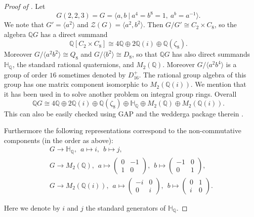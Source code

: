 \documentclass[a4paper,10pt]{amsart}
\theoremstyle{definition}
\theoremstyle{remark}
\newcommand{\ZZ}{\mathcal{Z}}
\begin{document}
\begin{proof}[Proof of ]
Let
\[G(2,2,3) = G = \langle a, b \ | \ a^4 = b^8 = 1, \ a^b = a^{-1} \rangle. \]
We note that $G' = \langle a^2 \rangle$ and $\ZZ(G) = \langle a^2, b^2 \rangle$. Then $G/G' \cong C_2 \times C_8$, so the algebra $\mathbb{Q}G$ has a direct summand 
\[\mathbb{Q}[C_2 \times C_8] \cong 4\mathbb{Q} \oplus 2\mathbb{Q}(i) \oplus \mathbb{Q}(\zeta_8).\]
Moreover $G/\langle a^2b^2 \rangle \cong Q_8$ and $G/\langle b^2 \rangle \cong D_8$, so that $\mathbb{Q}G$ has also direct summands $\mathbb{H}_\mathbb{Q}$, the standard rational quaternions, and $M_2(\mathbb{Q})$. Moreover $G/\langle a^2b^4 \rangle$ is a group of order $16$ sometimes denoted by $D_{16}^+$. The rational group algebra of this group has one matrix component isomorphic to $M_2(\mathbb{Q}(i))$. We mention that it has been used in \cite{BachleMaheshwaryMargolis} to solve another problem on integral group rings. Overall
\[ \mathbb{Q}G \cong 4\mathbb{Q} \oplus 2\mathbb{Q}(i) \oplus \mathbb{Q}(\zeta_8) \oplus \mathbb{H}_\mathbb{Q} \oplus M_2(\mathbb{Q}) \oplus M_2(\mathbb{Q}(i)). \]
This can also be easily checked using GAP \cite{GAP} and the wedderga package therein \cite{wedderga}. 

Furthermore the following representations correspond to the non-commutative components (in the order as above):
\begin{align}\label{eq:G223Reps}
&G \rightarrow \mathbb{H}_\mathbb{Q}, \ \  a  \mapsto i, \ \ b \mapsto j, \nonumber \\
&G \rightarrow M_2(\mathbb{Q}), \ \ a  \mapsto \begin{pmatrix} 0 & -1 \\ 1 & 0 \end{pmatrix}, \ \ b \mapsto \begin{pmatrix} -1 & 0 \\ 0 & 1 \end{pmatrix}, \\
&G \rightarrow M_2(\mathbb{Q}(i)), \ \ a  \mapsto \begin{pmatrix} -i & 0 \\ 0 & i \end{pmatrix}, \ \ b \mapsto \begin{pmatrix} 0 & 1 \\ i & 0 \end{pmatrix} \nonumber.
\end{align}

Here we denote by $i$ and $j$ the standard generators of $\mathbb{H}_\mathbb{Q}$.


\end{proof}
\end{document}
